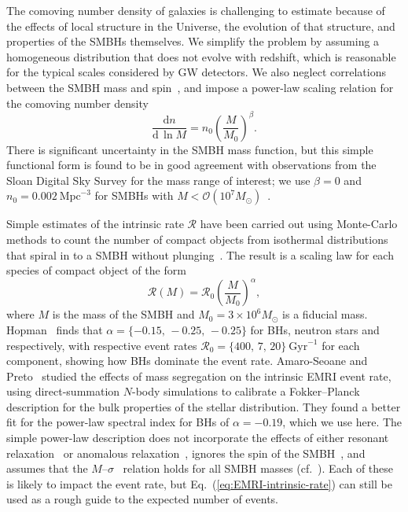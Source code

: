\documentclass[aps,prd,amsfonts,amssymb,amsmath,nofootinbib,showpacs,superscriptaddress,twocolumn,floatfix]{revtex4-1}
\newcommand{\eqnref}[1]{Eq.~(\ref{eq:#1})}
\newcommand{\dd}{\ensuremath{\mathrm{d}}}
\newcommand{\diff}[2]{\ensuremath{\dfrac{\dd {#1}}{\dd {#2}}}}
\newcommand{\order}[1]{\ensuremath{\mathcal{O}({#1})}}
\begin{document}
The comoving number density of galaxies is challenging to estimate because of the effects of local structure in the Universe, the evolution of that structure, and properties of the SMBHs themselves. We simplify the problem by assuming a homogeneous distribution that does not evolve with redshift, which is reasonable for the typical scales considered by GW detectors. We also neglect correlations between the SMBH mass and spin~\cite{Volonteri2010,Dotti2013,Sesana2014}, and impose a power-law scaling relation for the comoving number density
\begin{equation}
\diff{n}{\,\ln M} = n_0 \left(\frac{M}{M_0}\right)^\beta.
\end{equation}
There is significant uncertainty in the SMBH mass function, but this simple functional form is found to be in good agreement with observations from the Sloan Digital Sky Survey for the mass range of interest; we use $\beta = 0$ and $n_0 = 0.002~\mathrm{Mpc}^{-3}$ for SMBHs with $M < \order{10^7 M_\odot}$~\cite{Greene2007, Gair2010b}.

Simple estimates of the intrinsic rate $\mathcal{R}$ have been carried out using Monte-Carlo methods to count the number of compact objects from isothermal distributions that spiral in to a SMBH without plunging~\cite{Merritt2013}. The result is a scaling law for each species of compact object of the form
\begin{equation}
\label{eq:EMRI-intrinsic-rate}
\mathcal{R}(M) = \mathcal{R}_0 \left(\frac{M}{M_0}\right)^\alpha,
\end{equation}
where $M$ is the mass of the SMBH and $M_0 = 3\times 10^6 M_\odot$ is a fiducial mass. Hopman~\cite{Hopman2009a} finds that $\alpha = \{-0.15,\,-0.25,\,-0.25\}$ for BHs, neutron stars and respectively, with respective event rates $\mathcal{R}_0 = \{400,\, 7,\, 20\}~\mathrm{Gyr}^{-1}$ for each component, showing how BHs dominate the event rate. Amaro-Seoane and Preto~\cite{Amaro-Seoane2011d} studied the effects of mass segregation on the intrinsic EMRI event rate, using direct-summation $N$-body simulations to calibrate a Fokker--Planck description for the bulk properties of the stellar distribution. They found a better fit for the power-law spectral index for BHs of $\alpha = -0.19$, which we use here. The simple power-law description does not incorporate the effects of either resonant relaxation~\cite{Rauch1996,Rauch1998,Merritt2011} or anomalous relaxation~\cite{Hamers2014,Merritt2015c}, ignores the spin of the SMBH~\cite{Amaro-Seoane2012b}, and assumes that the $M$--$\sigma$~\cite{Ferrarese2000,Graham2016} relation holds for all SMBH masses (cf.\ \cite{Hlavacek-Larrondo2012,Ferre-Mateu2015,VanLoon2015,Trakhtenbrot2015,King2016}). Each of these is likely to  impact the event rate, but \eqnref{EMRI-intrinsic-rate} can still be used as a rough guide to the expected number of events.
\end{document}
